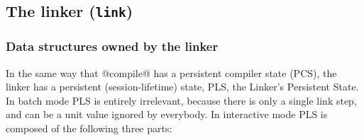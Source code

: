\documentclass[11pt]{article}
\begin{document}
\subsection{The linker (\mbox{\tt link})}
\label{sec:linker}

\subsubsection{Data structures owned by the linker}

In the same way that @compile@ has a persistent compiler state (PCS),
the linker has a persistent (session-lifetime) state, PLS, the
Linker's Persistent State.  In batch mode PLS is entirely irrelevant,
because there is only a single link step, and can be a unit value
ignored by everybody.  In interactive mode PLS is composed of the
following three parts:
\end{document}
